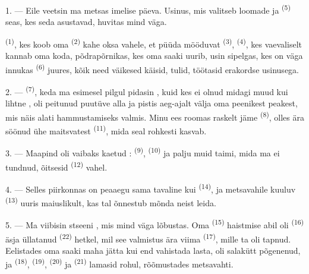 \VUsaut{3.0mm}
\VUsaut{3.0mm}

\VUsaut{3.0mm}

1. --- Eile veetsin ma metsas imelise päeva. Usinus, mis valitseb loomade ja
 \textsuperscript{(5)} seas, kes seda asustavad, huvitas mind väga.

 \textsuperscript{(1)}, kes koob oma  \textsuperscript{(2)}
kahe oksa vahele, et püüda mööduvat  \textsuperscript{(3)}, 
\textsuperscript{(4)}, kes vaevaliselt kannab oma koda, põdrapõrnikas, kes oma saaki
uurib, usin sipelgas, kes on väga innukas  \textsuperscript{(6)}
juures, kõik need väikesed käisid, tulid, töötasid erakordse usinusega.

2. ---  \textsuperscript{(7)}, keda ma esimesel pilgul pidasin
, kuid kes ei olnud midagi muud kui lihtne , oli
peitunud puutüve alla ja pistis aeg-ajalt välja oma peenikest peakest, mis näis alati
hammustamiseks valmis. Minu ees roomas raskelt jäme 
\textsuperscript{(8)}, olles ära söönud ühe maitsvatest 
\textsuperscript{(11)}, mida seal rohkesti kasvab.

3. --- Maapind oli vaibaks kaetud : 
\textsuperscript{(9)},  \textsuperscript{(10)} ja palju muid taimi, mida
ma ei tundnud, õitsesid  \textsuperscript{(12)} vahel.

4. --- Selles piirkonnas on  peaaegu sama tavaline kui 
\textsuperscript{(14)}, ja metsavahile kuuluv  \textsuperscript{(13)} uuris
maiuslikult, kas tal õnnestub mõnda neist leida.

\VUsaut{3.0mm}
\VUsaut{3.0mm}

5. --- Ma viibisin stseeni , mis mind väga lõbustas. Oma
 \textsuperscript{(15)} haistmise abil oli 
\textsuperscript{(16)} äsja üllatanud  \textsuperscript{(22)} hetkel, mil
see valmistus ära viima  \textsuperscript{(17)}, mille ta oli tapnud.
Eelistades oma saaki maha jätta kui end vahistada lasta, oli salakütt põgenenud, ja
 \textsuperscript{(18)},  \textsuperscript{(19)},
 \textsuperscript{(20)} ja  \textsuperscript{(21)}
lamasid rohul, rõõmustades metsavahti.

